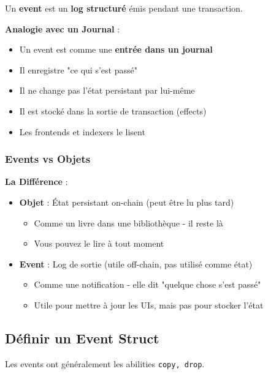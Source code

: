 \documentclass[11pt]{article}
\begin{document}
Un \textbf{event} est un \textbf{log structuré} émis pendant une transaction.

\begin{explainBox}
\textbf{Analogie avec un Journal} :
\begin{itemize}
  \item Un event est comme une \textbf{entrée dans un journal}
  \item Il enregistre "ce qui s'est passé"
  \item Il ne change pas l'état persistant par lui-même
  \item Il est stocké dans la sortie de transaction (effects)
  \item Les frontends et indexers le lisent
\end{itemize}
\end{explainBox}

\subsubsection{Events vs Objets}

\begin{exampleBox}
\textbf{La Différence} :
\begin{itemize}
  \item \textbf{Objet} : État persistant on-chain (peut être lu plus tard)
  \begin{itemize}
    \item Comme un livre dans une bibliothèque - il reste là
    \item Vous pouvez le lire à tout moment
  \end{itemize}
  
  \item \textbf{Event} : Log de sortie (utile off-chain, pas utilisé comme état)
  \begin{itemize}
    \item Comme une notification - elle dit "quelque chose s'est passé"
    \item Utile pour mettre à jour les UIs, mais pas pour stocker l'état
  \end{itemize}
\end{itemize}
\end{exampleBox}

\subsection{Définir un Event Struct}

Les events ont généralement les abilities \texttt{copy, drop}.
\end{document}

